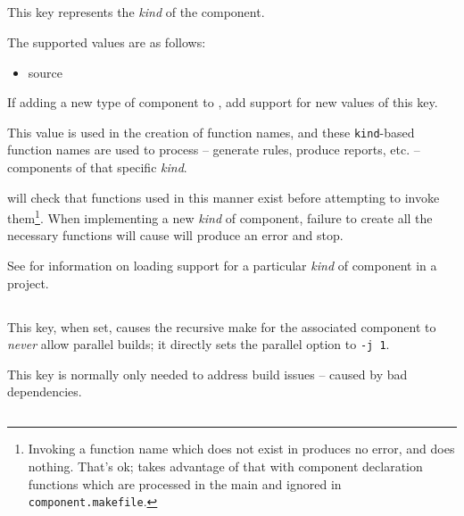 \subsection{}\label{variables:kind}

This key represents the \emph{kind} of the component.

The supported values are as follows:

\begin{itemize}
\item source
\end{itemize}

If adding a new type of component to \lmsbw, add support for new
values of this key.

This value is used in the creation of function names, and these
\texttt{kind}-based function names are used to process -- generate
rules, produce reports, etc. -- components of that specific
\emph{kind}.

\lmsbw will check that functions used in this manner exist before
attempting to invoke them\footnote{Invoking a function name which does
  not exist in \gnumake produces no error, and does nothing.  That's
  ok; \lmsbw takes advantage of that with component declaration
  functions which are processed in the main \makefile and ignored in
  \texttt{component.makefile}.}.  When implementing a new \emph{kind}
of component, failure to create all the necessary functions will cause
\lmsbw will produce an error and stop.

See  for information on
loading support for a particular \emph{kind} of component in a
project.


\subsection{}\label{variables:no-parallel}

This key, when set, causes the recursive make for the associated
component to \emph{never} allow parallel builds; it directly sets the
\gnumake parallel option to \texttt{-j 1}.

This key is normally only needed to address build issues -- caused by
bad dependencies.


\subsection{}\label{variables:prerequisite}

